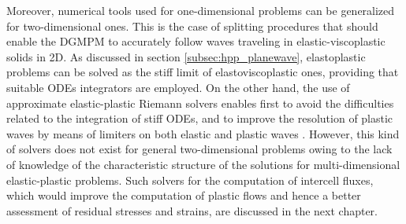 Moreover, numerical tools used for one-dimensional problems can be generalized for two-dimensional ones. 
This is the case of splitting procedures that should enable the DGMPM to accurately follow waves traveling in elastic-viscoplastic solids in 2D. 
As discussed in section \ref{subsec:hpp_planewave}, elastoplastic problems can be solved as the stiff limit of elastoviscoplastic ones, providing that suitable ODEs integrators are employed.%
On the other hand, the use of approximate elastic-plastic Riemann solvers enables first to avoid the difficulties related to the integration of stiff ODEs, and to improve the resolution of plastic waves by means of limiters on both elastic and plastic waves \cite{Thomas_EP}.
However, this kind of solvers does not exist for general two-dimensional problems owing to the lack of knowledge of the characteristic structure of the solutions for multi-dimensional elastic-plastic problems. 
Such solvers for the computation of intercell fluxes, which would improve the computation of plastic flows and hence a better assessment of residual stresses and strains, are discussed in the next chapter. 

